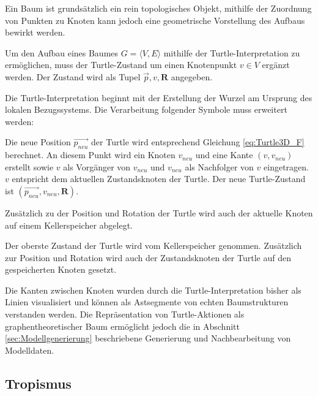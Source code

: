 Ein Baum ist grundsätzlich ein rein topologisches Objekt, mithilfe der Zuordnung von Punkten zu Knoten kann jedoch eine geometrische Vorstellung des Aufbaus bewirkt werden. \cite[S.23]{ABOP:04}

 Um den Aufbau eines Baumes $G = \langle V,E \rangle$ mithilfe der Turtle-Interpretation zu ermöglichen, muss der Turtle-Zustand um einen Knotenpunkt $v \in V$ ergänzt werden. Der Zustand wird als Tupel $\overrightarrow{p}, v, \boldsymbol{R}$ angegeben. 
 
 Die Turtle-Interpretation beginnt mit der Erstellung der Wurzel am Ursprung des lokalen Bezugssystems. Die Verarbeitung folgender Symbole muss erweitert werden:

\begin{description}[labelindent]
		\item[\boldmath$F(l)$]  Die neue Position $\overrightarrow{p_{neu}}$ der Turtle wird entsprechend Gleichung \ref{eq:Turtle3D_F} berechnet. An diesem Punkt wird ein Knoten $v_{neu}$ und eine Kante $(v,v_{neu})$ erstellt sowie $v$ als Vorgänger von $v_{neu}$ und $v_{neu}$ als Nachfolger von $v$ eingetragen. $v$ entspricht dem aktuellen Zustandsknoten der Turtle. Der neue Turtle-Zustand ist $(\overrightarrow{p_{neu}}, v_{neu}, \boldsymbol{R})$.  \\
	
	\item[\boldmath$\textbf{[}$] Zusätzlich zu der Position und Rotation der Turtle wird auch der aktuelle Knoten auf einem Kellerspeicher abgelegt.\\
	
	\item[\boldmath$\textbf{]}$] Der oberste Zustand der Turtle wird vom Kellerspeicher genommen. Zusätzlich zur Position und Rotation wird auch der Zustandsknoten der Turtle auf den gespeicherten Knoten gesetzt.\\
\end{description}

Die Kanten zwischen Knoten wurden durch die Turtle-Interpretation bisher als Linien visualisiert und können als Astsegmente von echten Baumstrukturen verstanden werden. \cite[S.23]{ABOP:04} Die Repräsentation von Turtle-Aktionen als graphentheoretischer Baum ermöglicht jedoch die in Abschnitt \ref{sec:Modellgenerierung} beschriebene Generierung und Nachbearbeitung von Modelldaten.

\subsection{Tropismus}

